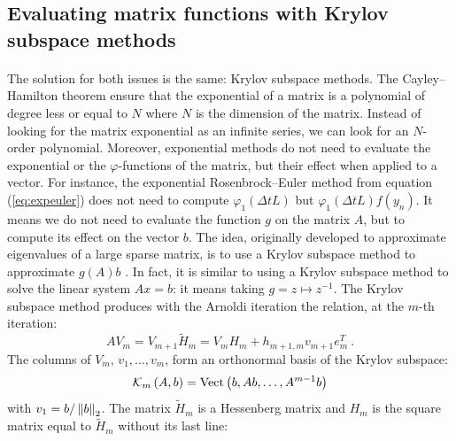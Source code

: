     \subsection{Evaluating matrix functions with Krylov subspace methods}

      \paragraph{}
      The solution for both issues is the same: Krylov subspace methods.
      The Cayley--Hamilton theorem ensure that the exponential of a matrix is a polynomial of degree less or equal to $N$ where $N$ is the dimension of the matrix.
      Instead of looking for the matrix exponential as an infinite series, we can look for an $N$-order polynomial.
      Moreover, exponential methods do not need to evaluate the exponential or the $\varphi$-functions of the matrix, but their effect when applied to a vector.
      For instance, the exponential Rosenbrock--Euler method from equation (\ref{eq:expeuler}) does not need to compute $\varphi_1\left(\Delta t L\right)$ but $\varphi_1\left(\Delta t L\right)f\left(y_n\right)$.
      It means we do not need to evaluate the function $g$ on the matrix $A$, but to compute its effect on the vector $b$.
      The idea, originally developed to approximate eigenvalues of a large sparse matrix, is to use a Krylov subspace method to approximate $g\left(A\right)b$ \cite{Saad1992, Sidje1998}.
      In fact, it is similar to using a Krylov subspace method to solve the linear system $Ax = b$: it means taking $g = z \mapsto z^{-1}$.
      The Krylov subspace method produces with the Arnoldi iteration the relation, at the $m$-th iteration:
      \begin{equation}\label{eq:arnoldi}
        AV_m = V_{m+1} \tilde{H}_m = V_m H_m + h_{m+1, m} v_{m+1} e_m^T \ .
      \end{equation}
      The columns of $V_m$, $v_1, \dots, v_m$, form an orthonormal basis of the Krylov subspace:
      \begin{equation}
        \krylov[A, b]{m} = \operatorname{Vect}\left( b, Ab, \dots, A^{m-1}b \right)
      \end{equation}
      with $v_1 = b / \norm[2]{b}$.
      The matrix $\tilde{H}_m$ is a Hessenberg matrix and $H_m$ is the square matrix equal to $\tilde{H}_m$ without its last line:
